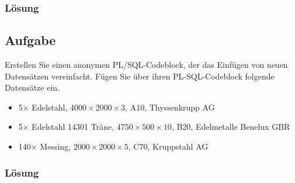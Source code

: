 \subsubsection*{Lösung}
\label{sec:uebung_06.aufgabe_03.loesung}


\subsection{Aufgabe}
\label{sec:uebung_06.aufgabe_04}
Erstellen Sie einen anonymen PL/SQL-Codeblock, der das Einfügen von neuen Datensätzen vereinfacht.
Fügen Sie über ihren PL-SQL-Codeblock folgende Datensätze ein.

\begin{itemize}[itemsep=0pt]
  \item 5$\times$ Edelstahl, $4000\times2000\times3$, A10, Thyssenkrupp AG
  \item 5$\times$ Edelstahl 14301 Träne, $4750\times500\times10$, B20, Edelmetalle Benelux GBR
  \item 140$\times$ Messing, $2000\times2000\times5$, C70, Kruppstahl AG
\end{itemize}

\subsubsection*{Lösung}
\label{sec:uebung_06.aufgabe_04.loesung}
